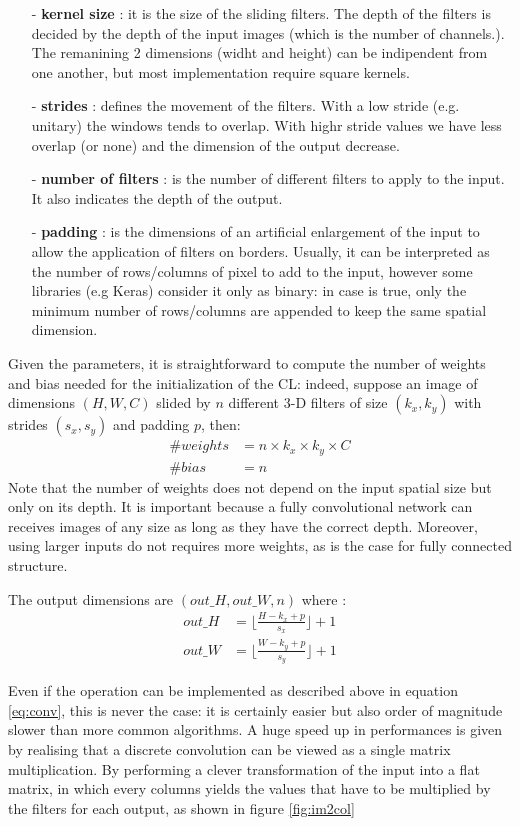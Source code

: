\documentclass[12pt,a4paper]{report}
\begin{document}
\begin{itemize}
 \setlength\itemsep{-0.2em}
 \item [-] {\bf kernel size} : it is the size of the sliding filters. The depth of the filters is decided by the depth of the input images (which is the number of channels.). The remanining 2 dimensions (widht and height) can be indipendent from one another, but most implementation require square kernels.
 \item [-] {\bf strides} : defines the movement of the filters. With a low stride (e.g. unitary) the windows tends to overlap. With highr stride values we have less overlap (or none) and the dimension of the output decrease.
 \item [-] {\bf number of filters} : is the number of different filters to apply to the input. It also indicates the depth of the output.
 \item [-] {\bf padding} : is the dimensions of an artificial enlargement of the input to allow the application of filters on borders. Usually, it can be interpreted as the number of rows/columns of pixel to add to the input, however some libraries (e.g Keras) consider it only as binary: in case is true, only the minimum number of rows/columns are appended to keep the same spatial dimension.
\end{itemize}
Given the parameters, it is straightforward to compute the number of weights and bias needed for the initialization of the CL: indeed, suppose an image of dimensions $(H, W, C)$ slided by $n$ different 3-D filters of size $(k_x, k_y)$ with strides $(s_x, s_y)$ and padding $p$, then:
\begin{align}
 \# weights &= n \times k_x \times k_y \times C \\
 \# bias &= n
\end{align}
Note that the number of weights does not depend on the input spatial size but only on its depth. It is important because a fully convolutional network can receives images of any size as long as they have the correct depth. Moreover, using larger inputs do not requires more weights, as is the case for fully connected structure. 

The output dimensions are $(out\_H, out\_W, n)$ where :
\begin{align}
 out\_H &= \lfloor\frac{H - k_x + p}{s_x}\rfloor + 1 \\
 out\_W &= \lfloor\frac{W - k_y + p}{s_y}\rfloor + 1
\end{align}

Even if the operation can be implemented as described above in equation \ref{eq:conv}, this is never the case: it is certainly easier but also order of magnitude slower than more common algorithms.
A huge speed up in performances is given by realising that a discrete convolution can be viewed as a single matrix multiplication. By performing a clever transformation of the input into a flat matrix, in which every columns yields the values that have to be multiplied by the filters for each output, as shown in figure \ref{fig:im2col}
\end{document}
